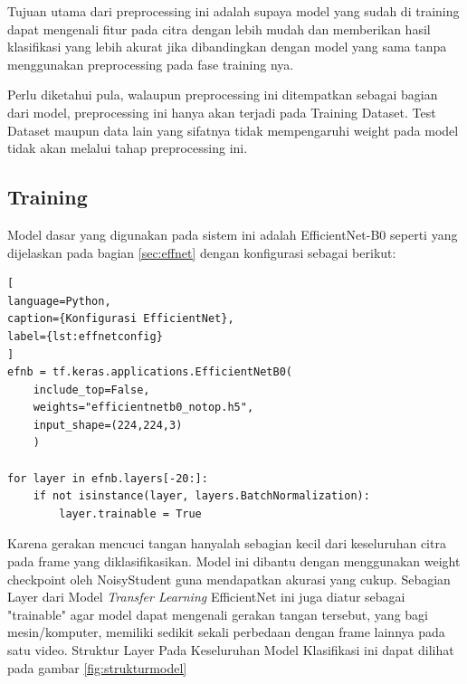 Tujuan utama dari preprocessing ini adalah supaya model yang sudah di training dapat mengenali fitur pada citra dengan lebih mudah dan memberikan hasil klasifikasi yang lebih akurat jika dibandingkan dengan model yang sama tanpa menggunakan preprocessing pada fase training nya.

Perlu diketahui pula, walaupun preprocessing ini ditempatkan sebagai bagian dari model, preprocessing ini hanya akan terjadi pada Training Dataset. Test Dataset maupun data lain yang sifatnya tidak mempengaruhi weight pada model tidak akan melalui tahap preprocessing ini.

\subsection{Training}
\label{subsec:training}

Model dasar yang digunakan pada sistem ini adalah EfficientNet-B0 \cite{cit:effnet} seperti yang dijelaskan pada bagian \ref{sec:effnet} dengan konfigurasi sebagai berikut:
\begin{lstlisting}[
language=Python,
caption={Konfigurasi EfficientNet},
label={lst:effnetconfig}
]
efnb = tf.keras.applications.EfficientNetB0(
	include_top=False,
	weights="efficientnetb0_notop.h5",
	input_shape=(224,224,3)
	)

for layer in efnb.layers[-20:]:
	if not isinstance(layer, layers.BatchNormalization):
		layer.trainable = True
\end{lstlisting} 

Karena gerakan mencuci tangan hanyalah sebagian kecil dari keseluruhan citra pada frame yang diklasifikasikan. Model ini dibantu dengan menggunakan weight checkpoint oleh NoisyStudent \cite{cit:noisy} guna mendapatkan akurasi yang cukup. Sebagian Layer dari Model \textit{Transfer Learning} EfficientNet ini juga diatur sebagai "trainable" agar model dapat mengenali gerakan tangan tersebut, yang bagi mesin/komputer, memiliki sedikit sekali perbedaan dengan frame lainnya pada satu video. Struktur Layer Pada Keseluruhan Model Klasifikasi ini dapat dilihat pada gambar \ref{fig:strukturmodel}

